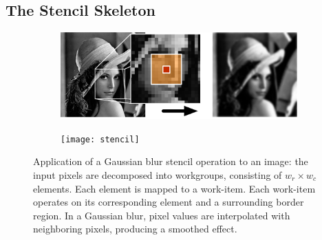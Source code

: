 \subsection{The Stencil Skeleton}

\begin{figure}
  \centering
  \begin{subfigure}[h]{.55\columnwidth}
    \centering
    \includegraphics[width=\textwidth]{img/lena-stencil}
  \end{subfigure}
  \begin{subfigure}[h]{.4\columnwidth}
    \centering
    \texttt{[image: stencil]}
  \end{subfigure}
  \caption{%
    Application of a Gaussian blur stencil operation to an image: the
    input pixels are decomposed into workgroups, consisting of
    $w_r \times w_c$ elements. Each element is mapped to a
    work-item. Each work-item operates on its corresponding element
    and a surrounding border region. In a Gaussian blur, pixel values
    are interpolated with neighboring pixels, producing a smoothed
    effect.%
  }
  \label{fig:stencil-img}
\end{figure}


